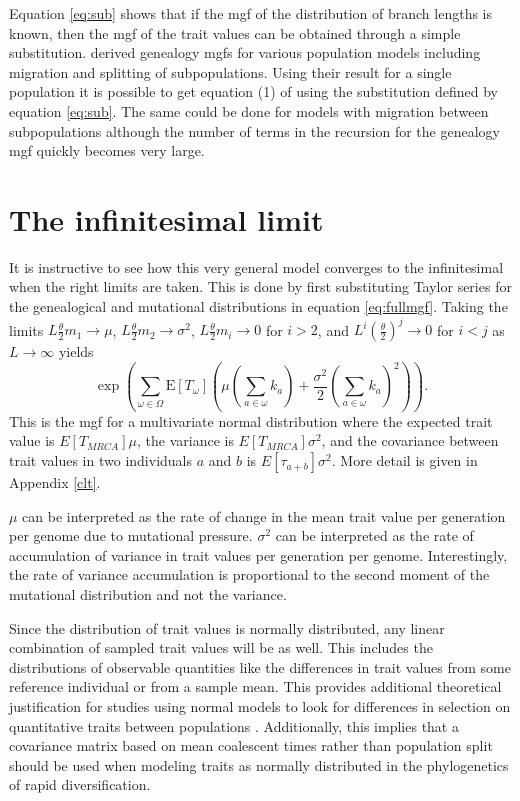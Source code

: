 \documentclass{article}
\newcommand{\T}{\frac{\theta}{2}}
\newcommand{\E}{\mathrm{E}}
\begin{document}
Equation \eqref{eq:sub} shows that if the mgf of the distribution of branch
lengths is known, then the mgf of the trait values can be obtained through a
simple substitution. \citet{Lohse2011} derived genealogy mgfs for various
population models including migration and splitting of subpopulations. Using
their result for a single population it is possible to get equation (1) of
\citet{Schraiber2015} using the substitution defined by equation \eqref{eq:sub}.
The same could be done for models with migration between subpopulations although
the number of terms in the recursion for the genealogy mgf quickly becomes very
large. 

\section{The infinitesimal limit}
It is instructive to see how this very general model converges to the
infinitesimal when the right limits are taken. This is done by first
substituting Taylor series for the genealogical and mutational distributions in
equation \eqref{eq:fullmgf}. Taking the limits $L\T m_1 \to \mu$,
$L\T m_2\to \sigma^2$, $L\T m_i\to 0$ for $i>2$, and
$L^i\left(\T\right)^j \to 0$ for $i<j$ as $L\to \infty$ yields
\begin{equation}
  \label{eq:clt}
  \exp \left( \sum_{\omega \in \Omega}\E[T_{\omega}] \left( \mu \left(
  \sum_{a \in \omega} k_a\right) + \frac{\sigma^2}{2}\left( \sum_{a \in \omega}
  k_a\right)^2\right)\right).
\end{equation}
This is the mgf for a multivariate normal distribution where the expected trait
value is $E[T_{MRCA}] \mu$, the variance is $E[T_{MRCA}]\sigma^2$, and the
covariance between trait values in two individuals $a$ and $b$ is
$E[\tau_{a+b}] \sigma^2$. More detail is given in Appendix \ref{clt}.

$\mu$ can be interpreted as the rate of change in the mean trait value per
generation per genome due to mutational pressure. $\sigma^2$ can be interpreted
as the rate of accumulation of variance in trait values per generation per
genome. Interestingly, the rate of variance accumulation is proportional to the
second moment of the mutational distribution and not the variance.

Since the distribution of trait values is normally distributed, any linear
combination of sampled trait values will be as well. This includes the
distributions of observable quantities like the differences in trait values from
some reference individual or from a sample mean. This provides additional
theoretical justification for studies using normal models to look for
differences in selection on quantitative traits between populations
\citep{Ovaskainen2011,Praebel2013,Berg2014,Robinson2015}. Additionally, this
implies that a covariance matrix based on mean coalescent times rather than
population split should be used when modeling traits as normally distributed in
the phylogenetics of rapid diversification.
\end{document}

